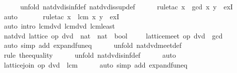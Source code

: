 \begin{isabellebody}
\ \ \ \ \isamarkupfalse%
\ {\isacharparenleft}unfold\ nat{\isacharunderscore}dvd{\isachardot}is{\isacharunderscore}inf{\isacharunderscore}def\ nat{\isacharunderscore}dvd{\isachardot}is{\isacharunderscore}sup{\isacharunderscore}def{\isacharparenright}\isanewline
\ \ \ \ \isamarkupfalse%
\ {\isacharparenleft}rule{\isacharunderscore}tac\ x\ {\isacharequal}\ {\isachardoublequoteopen}gcd\ x\ y{\isachardoublequoteclose}\ \ exI{\isacharparenright}\isanewline
\ \ \ \ \isamarkupfalse%
\ auto\ {\isacharbrackleft}{}{\isacharbrackright}\isanewline
\ \ \ \ \isamarkupfalse%
\ {\isacharparenleft}rule{\isacharunderscore}tac\ x\ {\isacharequal}\ {\isachardoublequoteopen}lcm\ x\ y{\isachardoublequoteclose}\ \ exI{\isacharparenright}\isanewline
\ \ \ \ \isamarkupfalse%
\ {\isacharparenleft}auto\ intro{\isacharcolon}\ lcm{\isacharunderscore}dvd{}\ lcm{\isacharunderscore}dvd{}\ lcm{\isacharunderscore}least{\isacharparenright}\isanewline
\ \ \ \ \isamarkupfalse%
\isanewline
\ \ \isamarkupfalse%
\ \isamarkupfalse%
\ nat{\isacharunderscore}dvd{\isacharcolon}\ lattice\ {\isachardoublequoteopen}op\ dvd\ {\isacharcolon}{\isacharcolon}\ nat\ {\isasymRightarrow}\ nat\ {\isasymRightarrow}\ bool{\isachardoublequoteclose}\ \isacommand{{\isachardot}}\isamarkupfalse%
\isanewline
\ \ \isamarkupfalse%
\ {\isachardoublequoteopen}lattice{\isachardot}meet\ op\ dvd\ {\isacharequal}\ gcd{\isachardoublequoteclose}\isanewline
\ \ \ \ \isamarkupfalse%
\ {\isacharparenleft}auto\ simp\ add{\isacharcolon}\ expand{\isacharunderscore}fun{\isacharunderscore}eq{\isacharparenright}\isanewline
\ \ \ \ \isamarkupfalse%
\ {\isacharparenleft}unfold\ nat{\isacharunderscore}dvd{\isachardot}meet{\isacharunderscore}def{\isacharparenright}\isanewline
\ \ \ \ \isamarkupfalse%
\ {\isacharparenleft}rule\ the{\isacharunderscore}equality{\isacharparenright}\isanewline
\ \ \ \ \isamarkupfalse%
\ {\isacharparenleft}unfold\ nat{\isacharunderscore}dvd{\isachardot}is{\isacharunderscore}inf{\isacharunderscore}def{\isacharparenright}\isanewline
\ \ \ \ \isamarkupfalse%
\ auto\isanewline
\ \ \isamarkupfalse%
\ {\isachardoublequoteopen}lattice{\isachardot}join\ op\ dvd\ {\isacharequal}\ lcm{\isachardoublequoteclose}\isanewline
\ \ \ \ \isamarkupfalse%
\ {\isacharparenleft}auto\ simp\ add{\isacharcolon}\ expand{\isacharunderscore}fun{\isacharunderscore}eq{\isacharparenright}\isanewline

\end{isabellebody}
